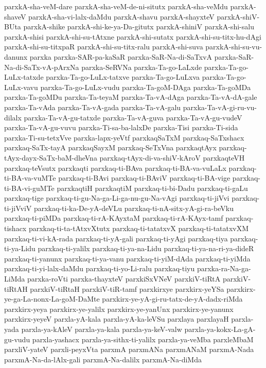 {parxkA-sha-veM-dare
parxkA-sha-veM-de-ni-situtx
parxkA-sha-veMdu
parxkA-shaveV
parxkA-sha-vi-lalx-daMdu
parxkA-shavu
parxkA-shayxteV
parxkA-shiV-BUta
parxkA-shike
parxkA-shi-ke-ya-Da-gitutx
parxkA-shiniV
parxkA-shi-salu
parxkA-shisi
parxkA-shi-su-tAtxne
parxkA-shi-sutatx
parxkA-shi-su-titx-hu-dAgi
parxkA-shi-su-titxpaR
parxkA-shi-su-titx-ralu
parxkA-shi-suva
parxkA-shi-su-vu-danunx
parxka
parxka-SAR-pa-kaSaR
parxka-SaR-Na-di-SaTxvA
parxka-SaR-Na-di-SaTx-vA-pArxNa
parxka-SeRVNa
parxka-Ta-go-LaLxde
parxka-Ta-go-LuLx-tatxde
parxka-Ta-go-LuLx-tatxve
parxka-Ta-go-LuLxva
parxka-Ta-go-LuLx-vavu
parxka-Ta-go-LuLx-vudu
parxka-Ta-goM-DAga
parxka-Ta-goMDa
parxka-Ta-goMDu
parxka-Ta-teyaM
parxka-Ta-vA-dAga
parxka-Ta-vA-dA-gale
parxka-Ta-vAda
parxka-Ta-vA-gada
parxka-Ta-vA-galu
parxka-Ta-vA-gi-ru-vu-dilalx
parxka-Ta-vA-gu-tatxde
parxka-Ta-vA-guva
parxka-Ta-vA-gu-vudeV
parxka-Ta-vA-gu-vuvu
parxka-Ti-sa-ba-lalxDe
parxka-Tisi
parxka-Ti-sida
parxka-Ti-su-tetxVve
parxka-lapx-yeVtf
parxkaqSaTxM
parxkaq-SaTxshacx
parxkaq-SaTx-tayA
parxkaqSayxM
parxkaq-SeTxVna
parxkaqtAyx
parxkaq-tAyx-dayx-SaTx-baM-dheVna
parxkaq-tAyx-di-va-shiV-kAroV
parxkaqteVH
parxkaq-teVsutx
parxkaqti
parxkaq-ti-BAva
parxkaq-ti-BA-va-vuLaLx
parxkaq-ti-BA-va-vuMTe
parxkaq-ti-BAvi
parxkaq-ti-BAviV
parxkaq-ti-BA-vige
parxkaq-ti-BA-vi-guMTe
parxkaqtiH
parxkaqtiM
parxkaq-ti-bi-Dadu
parxkaq-ti-gaLu
parxkaq-tige
parxkaq-ti-gu-Na-ga-Li-ga-nu-gu-Na-vAgi
parxkaq-ti-jiVvi
parxkaq-ti-jiVviV
parxkaq-ti-ka-De-yA-deVLu
parxkaq-ti-nA-sitx-yA-gi-ra-beVku
parxkaq-ti-piMDa
parxkaq-ti-rA-KAyxtaM
parxkaq-ti-rA-KAyx-tamf
parxkaq-tishacx
parxkaq-ti-ta-tAtxvXtutx
parxkaq-ti-tatatxvX
parxkaq-ti-tatatxvXM
parxkaq-ti-vi-kA-rada
parxkaq-ti-yA-gali
parxkaq-ti-yAgi
parxkaq-tiya
parxkaq-ti-ya-Lidu
parxkaq-ti-yalilx
parxkaq-ti-ya-na-Lidu
parxkaq-ti-ya-na-ri-ya-dideR
parxkaq-ti-yanunx
parxkaq-ti-ya-vanu
parxkaq-ti-yiM-dAda
parxkaq-ti-yiMda
parxkaq-ti-yi-lalx-daMdu
parxkaq-ti-yo-Li-ralu
parxkaq-tiyu
parxka-ra-Na-ga-LiMda
parxka-roVti
parxka-thayxteV
parxkiSxVNeV
parxkiV-tiRtA
parxkiV-tiRtAH
parxkiV-tiRtaH
parxkiV-tiR-tamf
parxkirxye
parxkirx-yeYSa
parxkirx-ye-ga-La-nonx-La-goM-DaMte
parxkirx-ye-yA-gi-ru-tatx-de-yA-dadx-riMda
parxkirx-yeya
parxkirx-ye-yalilx
parxkirx-ye-yanUnx
parxkirx-ye-yanunx
parxkirx-yeyeV
parxla-yA-kala
parxla-yA-ka-leVSu
parxlaya
parxlayaH
parxla-yada
parxla-ya-kAleV
parxla-ya-kala
parxla-ya-keV-valw
parxla-ya-kokx-La-gA-gu-vudu
parxla-yashacx
parxla-ya-sithx-ti-yalilx
parxla-ya-veMba
parxleMbaM
parxliV-yateV
parxli-peyxVta
parxmA
parxmANa
parxmANaM
parxmA-Nada
parxmA-Na-da-lAlx-gali
parxmA-Na-dalilx
parxmA-Na-diMda
}

